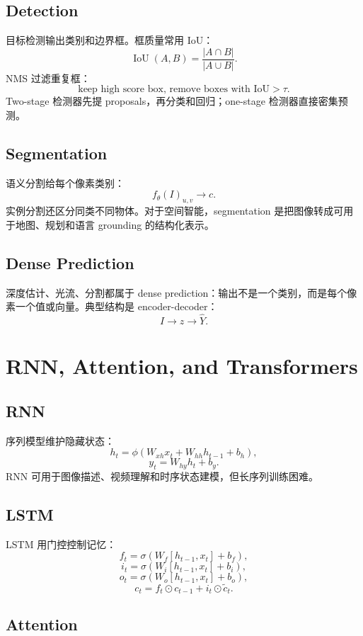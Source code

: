\documentclass[11pt]{article}
\begin{document}
\subsection{Detection}

目标检测输出类别和边界框。框质量常用 IoU：
\[
  \operatorname{IoU}(A,B)=
  \frac{|A\cap B|}{|A\cup B|}.
\]
NMS 过滤重复框：
\[
  \text{keep high score box, remove boxes with IoU}>\tau.
\]
Two-stage 检测器先提 proposals，再分类和回归；one-stage 检测器直接密集预测。

\subsection{Segmentation}

语义分割给每个像素类别：
\[
  f_\theta(I)_{u,v}\rightarrow c.
\]
实例分割还区分同类不同物体。对于空间智能，segmentation 是把图像转成可用于地图、规划和语言 grounding 的结构化表示。

\subsection{Dense Prediction}

深度估计、光流、分割都属于 dense prediction：输出不是一个类别，而是每个像素一个值或向量。典型结构是 encoder-decoder：
\[
  I\rightarrow z\rightarrow \hat Y.
\]

\section{RNN, Attention, and Transformers}

\subsection{RNN}

序列模型维护隐藏状态：
\[
  h_t=\phi(W_{xh}x_t+W_{hh}h_{t-1}+b_h),
\]
\[
  y_t=W_{hy}h_t+b_y.
\]
RNN 可用于图像描述、视频理解和时序状态建模，但长序列训练困难。

\subsection{LSTM}

LSTM 用门控控制记忆：
\[
  f_t=\sigma(W_f[h_{t-1},x_t]+b_f),
\]
\[
  i_t=\sigma(W_i[h_{t-1},x_t]+b_i),
\]
\[
  o_t=\sigma(W_o[h_{t-1},x_t]+b_o),
\]
\[
  c_t=f_t\odot c_{t-1}+i_t\odot \tilde c_t.
\]

\subsection{Attention}
\end{document}
